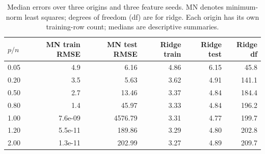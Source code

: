 \begin{table}[H]
\centering
\small
\caption{Median errors over three origins and three feature seeds. MN denotes minimum-norm least squares; degrees of freedom (df) are for ridge. Each origin has its own training-row count; medians are descriptive summaries.}\label{tab:complexity}
\begin{tabular}{lrrrrr}
\toprule
$p/n$ & MN train RMSE & MN test RMSE & Ridge train & Ridge test & Ridge df \\
\midrule
0.05 & 4.9 & 6.16 & 4.86 & 6.15 & 45.8 \\
0.20 & 3.5 & 5.63 & 3.62 & 4.91 & 141.1 \\
0.50 & 2.7 & 13.46 & 3.37 & 4.84 & 184.4 \\
0.80 & 1.4 & 45.97 & 3.33 & 4.84 & 196.2 \\
1.00 & 7.6e-09 & 4576.79 & 3.31 & 4.77 & 199.7 \\
1.20 & 5.5e-11 & 189.86 & 3.29 & 4.80 & 202.8 \\
2.00 & 1.3e-11 & 202.99 & 3.27 & 4.89 & 209.7 \\
\bottomrule
\end{tabular}
\end{table}
